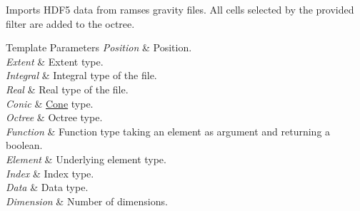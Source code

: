 Imports H\-D\-F5 data from ramses gravity files. All cells selected by the provided filter are added to the octree. 
\begin{DoxyTemplParams}{Template Parameters}
{\em Position} & Position. \\
\hline
{\em Extent} & Extent type. \\
\hline
{\em Integral} & Integral type of the file. \\
\hline
{\em Real} & Real type of the file. \\
\hline
{\em Conic} & \hyperlink{exceptionCone}{Cone} type. \\
\hline
{\em Octree} & Octree type. \\
\hline
{\em Function} & Function type taking an element as argument and returning a boolean. \\
\hline
{\em Element} & Underlying element type. \\
\hline
{\em Index} & Index type. \\
\hline
{\em Data} & Data type. \\
\hline
{\em Dimension} & Number of dimensions. \\
\hline
\end{DoxyTemplParams}

